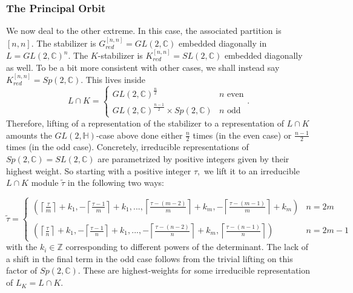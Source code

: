 \documentclass[letterpaper,twosided,11pt]{article}
\theoremstyle{plain}
\theoremstyle{definition}
\theoremstyle{remark}
\newcommand{\C}{\mathbb{C}}
\newcommand{\HH}{\mathbb{H}}
\newcommand{\Z}{\mathbb{Z}}
\begin{document}
\subsubsection{The Principal Orbit}

We now deal to the other extreme.
In this case, the associated partition is $ [n,n]. $ The stabilizer is $
G^{[n,n]}_{red}=GL(2,\C) $ embedded diagonally in $ L=GL(2,\C)^n. $ The $
K $-stabilizer is $ K^{[n,n]}_{red}=SL(2,\C) $ embedded diagonally as
well.  To be a bit more consistent with other cases, we shall instead
say $ K^{[n,n]}_{red}=Sp(2,\C). $ This lives inside
\[
    L\cap K=
    \begin{cases}
        GL(2,\C)^{\frac{n}{2}} & n \text{ even} \\
        GL(2,\C)^{\frac{n-1}{2}}\times Sp(2,\C) & n \text{ odd}
    \end{cases}.
\]
Therefore, lifting of a representation of the stabilizer to a
representation of $ L\cap K $ amounts the $ GL(2,\HH) $-case above done
either $ \frac{n}{2} $ times (in the even case) or $ \frac{n-1}{2} $
times (in the odd case). Concretely, irreducible representations of $ Sp(2,\C)=SL(2,\C)
$ are parametrized by positive integers given by their highest weight.
So starting with a positive integer $ \tau, $ we lift it to an
irreducible $ L\cap K $ module $ \tilde{\tau} $ in the following two
ways:

\[
    \tilde{\tau}=
    \begin{cases}
        \left( \left\lceil \frac{\tau}{m} \right \rceil+k_1, -\left\lceil
        \frac{\tau-1}{m} \right \rceil+k_1 ,...,\left\lceil \frac{\tau-(m-2)}
        {m} \right \rceil +k_{m},-\left\lceil \frac{\tau-(m-1)}{m}
        \right \rceil +k_{m} \right) & n=2m \\
        & \\
        \left( \left\lceil \frac{\tau}{n} \right \rceil+k_1,- \left\lceil
        \frac{\tau-1}{n} \right \rceil+k_1 ,...,-\left\lceil \frac{\tau-
        (n-2)}{n} \right \rceil +k_{m},\left\lceil \frac{\tau-(n-1)}{n}
        \right \rceil \right) & n=2m-1
    \end{cases}
\]
with the $ k_i \in \Z $ corresponding to different powers of the
determinant.  The lack of a shift in the final term in the odd case
follows from the trivial lifting on this factor of $ Sp(2,\C). $ These
are highest-weights for some irreducible representation of $ L_K=L\cap
K. $
\end{document}
